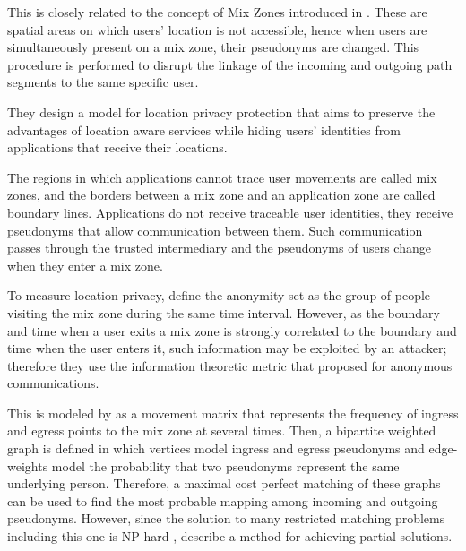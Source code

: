 \documentclass[times,twocolumn,final,authoryear]{elsarticle}
\begin{document}
This is closely related to the concept of Mix Zones introduced in \cite{Beresford2003}. These are spatial areas on which users' location is not accessible, hence when users are simultaneously present on a mix zone, their pseudonyms are changed. This procedure is performed to disrupt the linkage of the incoming and outgoing path segments to the same specific user.

They design a model for location privacy protection that aims to preserve the advantages of location aware services while hiding users' identities from applications that receive their locations.

The regions in which applications cannot trace user movements are called mix zones, and the borders between a mix zone and an application zone are called boundary lines.
Applications do not receive traceable user identities, they receive pseudonyms that allow communication between them. Such communication passes through the trusted intermediary and the pseudonyms of users change when they enter a mix zone.


To measure location privacy, \cite{Beresford04mixzones} define the anonymity set as the group of people visiting the mix zone during the same time interval. However, as the boundary and time when a user exits a mix zone is strongly correlated to the boundary and time when the user enters it, such information may be exploited by an attacker; therefore they use the information theoretic metric that \cite{Serjantov2002} proposed for anonymous communications. %


This is modeled by \cite{Beresford04mixzones} as a movement matrix that represents the frequency of ingress and egress points to the mix zone at several times.
Then, a bipartite weighted graph is defined in which vertices model ingress and egress pseudonyms and edge-weights
model the probability that two pseudonyms represent the same underlying person. Therefore, a maximal cost perfect matching of these graphs can be used to find the most probable mapping among incoming and outgoing pseudonyms.  
However, since the solution to many restricted matching problems including this one is NP-hard \citep{Tanimoto1978}, \cite{Beresford04mixzones} describe a method for achieving partial solutions.
\end{document}
